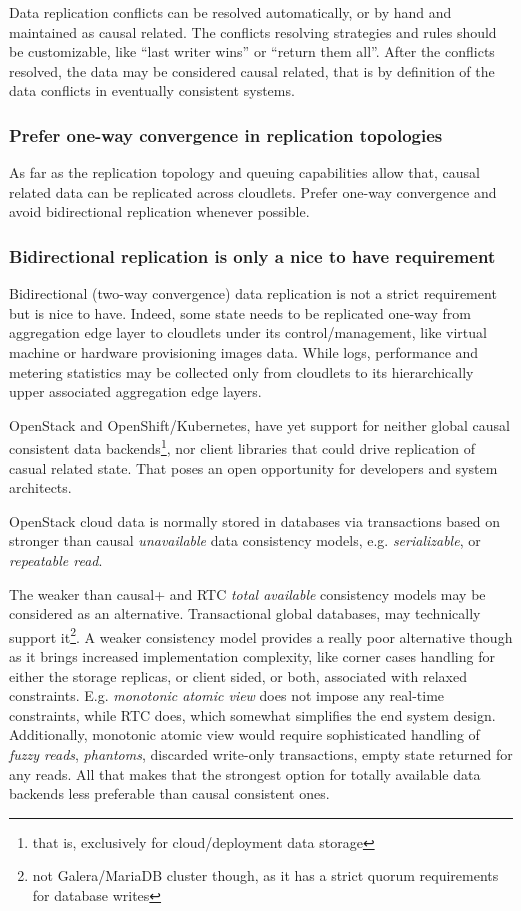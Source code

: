 \documentclass[conference]{IEEEtran}
\begin{document}
Data replication conflicts can be resolved automatically, or by hand and
maintained as causal related. The conflicts resolving strategies and rules
should be customizable, like ``last writer wins'' or ``return them all''. After
the conflicts resolved, the data may be considered causal related, that is by
definition\cite{b1} of the data conflicts in eventually consistent systems.

\subsubsection{Prefer one-way convergence in replication topologies}

As far as the replication topology and queuing capabilities allow
that, causal related data can be replicated across cloudlets. Prefer one-way
convergence and avoid bidirectional replication whenever possible.

\subsubsection{Bidirectional replication is only a nice to have requirement}

Bidirectional (two-way convergence) data replication is not a strict
requirement but is nice to have. Indeed, some state needs to be replicated
one-way from aggregation edge layer to cloudlets under its control/management,
like virtual machine or hardware provisioning images data. While logs,
performance and metering statistics may be collected only from cloudlets to its
hierarchically upper associated aggregation edge layers.

OpenStack and OpenShift/Kubernetes, have yet support for neither global causal
consistent data backends\footnote{that is, exclusively for cloud/deployment
data storage}, nor client libraries that could drive replication of casual
related state. That poses an open opportunity for developers and system
architects.

OpenStack cloud data is normally stored in databases via
transactions based on stronger than causal \textit{unavailable}\cite{b4} data
consistency models, e.g. \textit{serializable}\cite{b4}, or \textit{repeatable
read}\cite{b4}.

The weaker than causal+ and RTC \textit{total available}\cite{b4}
consistency models may be considered as an alternative. Transactional global
databases\cite{b5}, may technically support it\footnote{not Galera/MariaDB
cluster though, as it has a strict quorum requirements for database writes}. A
weaker consistency model provides a really poor alternative though as it brings
increased implementation complexity, like corner cases handling for either the
storage replicas, or client sided, or both, associated with relaxed
constraints. E.g. \textit{monotonic atomic view}\cite{b4} does not impose any
real-time constraints, while RTC does, which somewhat simplifies
the end system design. Additionally, monotonic atomic view would require
sophisticated handling of \textit{fuzzy reads}\cite{b4},
\textit{phantoms}\cite{b4}, discarded write-only transactions, empty state
returned for any reads. All that makes that the strongest option for totally
available data backends less preferable than causal consistent ones.
\end{document}
